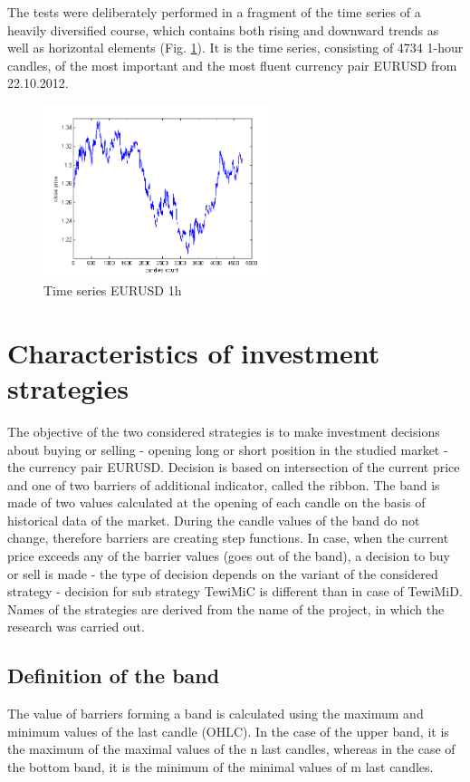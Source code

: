 \documentclass{tewiart}
\begin{document}
The tests were deliberately performed in a fragment of the time series of a heavily diversified course, which contains both rising and downward trends as well as horizontal elements (Fig. \ref{timeSeries}). It is the time series, consisting of 4734 1-hour candles, of the most important and the most fluent currency pair EURUSD from 22.10.2012.
\begin{figure}[h!]
\begin{center}
\includegraphics[width = 0.6\textwidth]{pictures/eurusd221012.png}
\end{center}
\caption{Time series EURUSD 1h}
\label{timeSeries}
\end{figure}
\FloatBarrier
\section{Characteristics of investment strategies}
The objective of the two considered strategies is to make investment decisions about buying or selling - opening long or short position in the studied market - the currency pair EURUSD. Decision is based on intersection of the current price and one of two barriers of additional indicator, called the ribbon. The band is made of two values calculated at the opening of each candle on the basis of historical data of the market. During the candle values of the band do not change, therefore barriers are creating step functions. In case, when the current price exceeds any of the barrier values (goes out of the band), a decision to buy or sell is made - the type of decision depends on the variant of the considered strategy - decision for sub strategy TewiMiC is different than in case of TewiMiD. Names of the strategies are derived from the name of the project, in which the research was carried out.

\subsection{Definition of the band}
The value of barriers forming a band is calculated using the maximum and minimum values of the last candle (OHLC). In the case of the upper band, it is the maximum of the maximal values of the n last candles, whereas in the case of the bottom band, it is the minimum of the minimal values of m last candles. 
\end{document}
